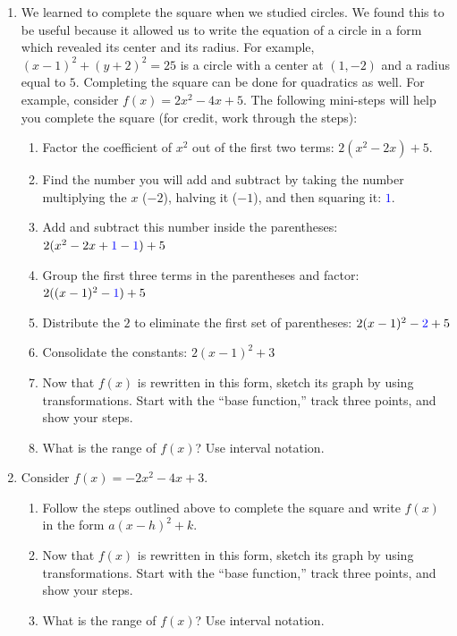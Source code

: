 \documentclass[12pt]{amsart}
\begin{document}
\begin{enumerate}
\item We learned to complete the square when we studied circles.  We found this to be useful because it allowed us to write the equation of a circle in a form which revealed its center and its radius.  For example, $(x-1)^2+ (y+2)^2=25$ is  a circle with a center at $(1,-2)$ and a radius equal to $5$.  Completing the square can be done for quadratics as well.  For example, consider $f(x)=2x^2-4x+5$.  The following mini-steps will help you complete the square (for credit, work through the steps):
\begin{enumerate}
\item Factor the coefficient of $x^2$ out of the first two terms: $2(x^2-2x)+5$.
\item Find the number you will add and subtract by taking the number multiplying the $x$ ($-2$), halving it ($-1$), and then squaring it: \textcolor{blue}{$1$}.
\item Add and subtract this number inside the parentheses: $2(x^2-2x +\textcolor{blue}{1}-\textcolor{blue}{1})+5$
\item Group the first three terms in the parentheses and factor: $2((x-1)^2-\textcolor{blue}{1})+5$
\item Distribute the $2$ to eliminate the first set of parentheses: $2(x-1)^2-\textcolor{blue}{2}+5$
\item Consolidate the constants: $2(x-1)^2+3$
\item Now that $f(x)$ is rewritten in this form, sketch its graph by using transformations.  Start with the ``base function,'' track three points, and show your steps.
\item What is the range of $f(x)$?  Use interval notation.

\end{enumerate}
 
 \item Consider $f(x)=-2x^2-4x+3$.  \begin{enumerate}
\item Follow the steps outlined above to complete the square and write $f(x)$ in the form $a(x-h)^2+k$.
\item Now that $f(x)$ is rewritten in this form, sketch its graph by using transformations.  Start with the ``base function,'' track three points, and show your steps.
\item What is the range of $f(x)$?  Use interval notation.

\end{enumerate}


\end{enumerate}
\end{document}
